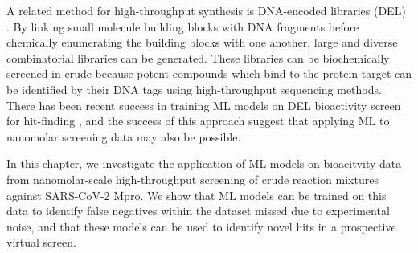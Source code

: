 A related method for high-throughput synthesis is DNA-encoded libraries (DEL) \cite{GirondaMartinez2021DNALibrary}. By linking small molecule building blocks with DNA fragments before chemically enumerating the building blocks with one another, large and diverse combinatorial libraries can be generated. These libraries can be biochemically screened in crude because potent compounds which bind to the protein target can be identified by their DNA tags using high-throughput sequencing methods. There has been recent success in training ML models on DEL bioactivity screen for hit-finding \cite{McCloskey2020DNALibrary, Lim2022DELCountML}, and the success of this approach suggest that applying ML to nanomolar screening data may also be possible.

In this chapter, we investigate the application of ML models on bioacitvity data from nanomolar-scale high-throughput screening of crude reaction mixtures against SARS-CoV-2 Mpro. We show that ML models can be trained on this data to identify false negatives within the dataset missed due to experimental noise, and that these models can be used to identify novel hits in a prospective virtual screen.



